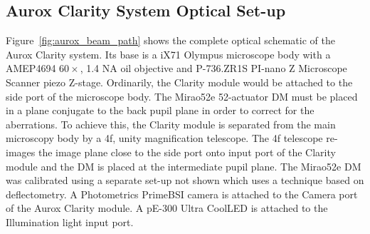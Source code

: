 \subsection{Aurox Clarity System Optical Set-up}
\label{subsec:aurox_optics}

Figure~\ref{fig:aurox_beam_path} shows the complete optical schematic of the Aurox Clarity system. Its base is a iX71 Olympus microscope body with a AMEP4694 $60\times$, 1.4 NA oil objective and P-736.ZR1S PI-nano Z Microscope Scanner piezo Z-stage. Ordinarily, the Clarity module would be attached to the side port of the microscope body. The Mirao52e 52-actuator DM must be placed in a plane conjugate to the back pupil plane in order to correct for the aberrations. To achieve this, the Clarity module is separated from the main microscopy body by a 4f, unity magnification telescope. The 4f telescope re-images the image plane close to the side port onto input port of the Clarity module and the DM is placed at the intermediate pupil plane. The Mirao52e DM was calibrated using a separate set-up not shown which uses a technique based on deflectometry.\cite{trumper2016instantaneous,huang2017close} A Photometrics PrimeBSI camera is attached to the Camera port of the Aurox Clarity module. A pE-300 Ultra CoolLED is attached to the Illumination light input port.

